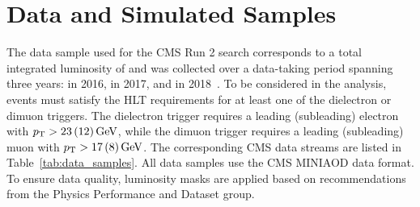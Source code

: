 \chapter{Data and Simulated Samples}\label{sec:data}

The data sample used for the CMS Run 2 \hzg{} search corresponds to a total integrated luminosity of \LumiT\fbinv and was collected over a data-taking period spanning three years: \Lumia\fbinv in 2016, \Lumib\fbinv in 2017, and \Lumic\fbinv in 2018~\cite{CMS-LUM-17-003,LUM-17-004,LUM-18-002}. 
To be considered in the analysis, events must satisfy the HLT requirements for at least one of the dielectron or dimuon triggers.
The dielectron trigger requires a leading (subleading) electron with
$p_{\mathrm{T}} > 23\,(12)\,\text{Ge\hspace{-.08em}V}$, while the dimuon trigger requires a leading (subleading) muon with $p_{\mathrm{T}} > 17\,(8)\,\text{Ge\hspace{-.08em}V}$.
The corresponding CMS data streams are listed in Table~\ref{tab:data_samples}. All data samples use the CMS MINIAOD data format.
To ensure data quality, luminosity masks are applied based on recommendations from the Physics Performance and Dataset group.

